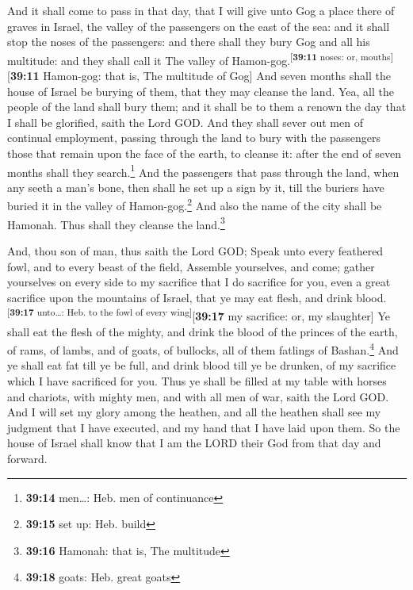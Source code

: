  And it shall come to pass in that day, that I will give
unto Gog a place there of graves in Israel, the valley of the passengers
on the east of the sea: and it shall stop the noses of the passengers:
and there shall they bury Gog and all his multitude: and they shall call
it The valley of Hamon-gog.\textsuperscript{{[}\textbf{39:11} noses: or,
mouths{]}}{[}\textbf{39:11} Hamon-gog: that is, The multitude of Gog{]}
 And seven months shall the house of Israel be burying of
them, that they may cleanse the land.  Yea, all the
people of the land shall bury them; and it shall be to them a renown the
day that I shall be glorified, saith the Lord GOD.  And
they shall sever out men of continual employment, passing through the
land to bury with the passengers those that remain upon the face of the
earth, to cleanse it: after the end of seven months shall they
search.\footnote{\textbf{39:14} men\ldots: Heb. men of continuance}
 And the passengers that pass through the land, when any
seeth a man's bone, then shall he set up a sign by it, till the buriers
have buried it in the valley of Hamon-gog.\footnote{\textbf{39:15} set
  up: Heb. build}  And also the name of the city shall be
Hamonah. Thus shall they cleanse the land.\footnote{\textbf{39:16}
  Hamonah: that is, The multitude}

 And, thou son of man, thus saith the Lord GOD; Speak
unto every feathered fowl, and to every beast of the field, Assemble
yourselves, and come; gather yourselves on every side to my sacrifice
that I do sacrifice for you, even a great sacrifice upon the mountains
of Israel, that ye may eat flesh, and drink
blood.\textsuperscript{{[}\textbf{39:17} unto\ldots: Heb. to the fowl of
every wing{]}}{[}\textbf{39:17} my sacrifice: or, my slaughter{]}
 Ye shall eat the flesh of the mighty, and drink the
blood of the princes of the earth, of rams, of lambs, and of goats, of
bullocks, all of them fatlings of Bashan.\footnote{\textbf{39:18} goats:
  Heb. great goats}  And ye shall eat fat till ye be
full, and drink blood till ye be drunken, of my sacrifice which I have
sacrificed for you.  Thus ye shall be filled at my table
with horses and chariots, with mighty men, and with all men of war,
saith the Lord GOD.  And I will set my glory among the
heathen, and all the heathen shall see my judgment that I have executed,
and my hand that I have laid upon them.  So the house of
Israel shall know that I am the LORD their God from that day and
forward.

